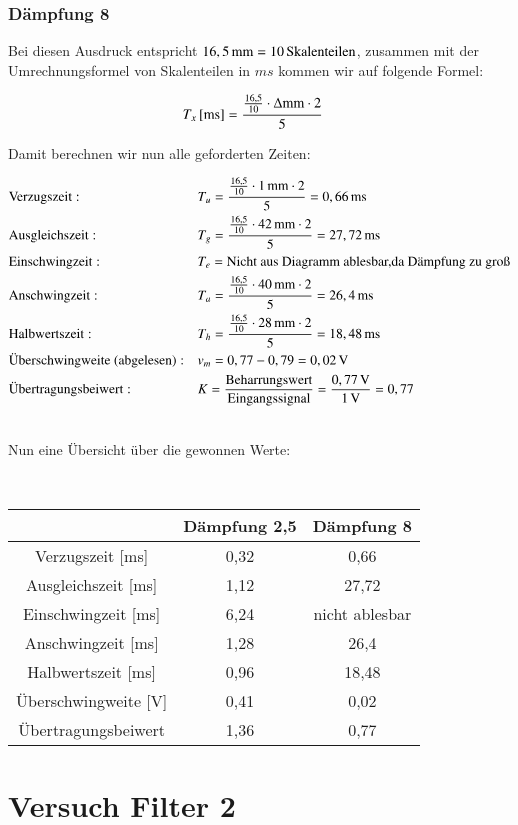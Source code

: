 \newpage

\subsubsection*{Dämpfung 8}


Bei diesen Ausdruck entspricht $\unit[16,5]{mm} = \unit[10]{Skalenteilen}$, zusammen mit der Umrechnungsformel von Skalenteilen in $ms$ kommen wir auf folgende Formel:

\begin{align*}
\unit[T_x]{[ms]} &= \frac{ \frac{16,5}{10} \cdot \Delta \text{mm} \cdot 2}{5}
\end{align*}

Damit berechnen wir nun alle geforderten Zeiten:

\begin{align*}
&\text{Verzugszeit}:  &&T_u = \frac{ \frac{16,5}{10} \cdot \unit[1]{mm} \cdot 2}{5} = \unit[0,66]{ms} \\
&\text{Ausgleichszeit}:  &&T_g = \frac{ \frac{16,5}{10} \cdot \unit[42]{mm} \cdot 2}{5} = \unit[27,72]{ms} \\
&\text{Einschwingzeit}:  &&T_e = \text{Nicht aus Diagramm ablesbar,da Dämpfung zu groß} \\
&\text{Anschwingzeit}:  &&T_a = \frac{ \frac{16,5}{10} \cdot \unit[40]{mm} \cdot 2}{5} = \unit[26,4]{ms} \\
&\text{Halbwertszeit}:  &&T_h = \frac{ \frac{16,5}{10} \cdot \unit[28]{mm} \cdot 2}{5} = \unit[18,48]{ms} \\
&\text{Überschwingweite (abgelesen)}:  &&v_m = 0,77 - 0,79 = \unit[0,02]{V} \\
&\text{Übertragungsbeiwert}:  &&K = \frac{\text{Beharrungswert}}{\text{Eingangssignal}} = \frac{\unit[0,77]{V}}{\unit[1]{V}} = \unit[0,77]{ } \\
\end{align*}

\hfill \\

Nun eine Übersicht über die gewonnen Werte:

\hfill \\

\begin{tabular}{c|c|c}
 & Dämpfung 2,5 & Dämpfung 8 \\ 
\hline 
Verzugszeit [ms] & 0,32 & 0,66 \\ 
\hline 
Ausgleichszeit [ms] & 1,12 & 27,72 \\ 
\hline 
Einschwingzeit [ms] & 6,24 & nicht ablesbar \\ 
\hline 
Anschwingzeit [ms] & 1,28 & 26,4 \\ 
\hline 
Halbwertszeit [ms] & 0,96 & 18,48 \\ 
\hline 
Überschwingweite [V] & 0,41 & 0,02 \\ 
\hline 
Übertragungsbeiwert & 1,36 & 0,77 \\ 
\end{tabular} 


\newpage



\section{Versuch Filter 2}




